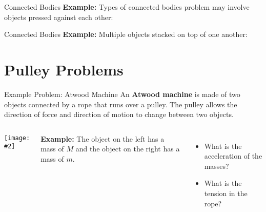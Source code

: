 \documentclass[12pt,compress,aspectratio=169]{beamer}
\newcommand{\pic}[2]{\texttt{[image: \#2]}}
\newcommand{\mb}[1]{\ensuremath\mathbf{#1}}
\begin{document}
\begin{frame}{Connected Bodies}
  \textbf{Example:} Types of connected bodies problem may involve objects
  pressed against each other:
  \begin{center}
  \end{center}
\end{frame}



\begin{frame}{Connected Bodies}
  \textbf{Example:} Multiple objects stacked on top of one another:
  \begin{center}
  \end{center}
\end{frame}


\section{Pulley Problems}

\begin{frame}{Example Problem: Atwood Machine}
  An \textbf{Atwood machine} is made of two objects connected by a rope that
  runs over a pulley. The pulley allows the direction of force and direction
  of motion to change between two objects.
  \begin{columns}
    \begin{center}
      \pic{1}{graphics/pulley_prob_2.png}
    \end{center}
    \textbf{Example:} The object on the left has a mass of $M$ and the object
    on the right has a mass of $m$.
    \begin{itemize}
    \item What is the acceleration of the masses?
    \item What is the tension in the rope?
    \end{itemize}
  \end{columns}
\end{frame}
\end{document}
